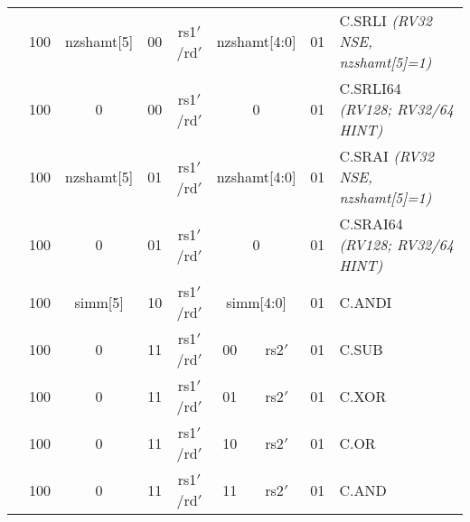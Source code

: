 \begin{table}[h]
\begin{small}
\begin{center}
\begin{tabular}{p{0in}p{0.05in}p{0.05in}p{0.05in}p{0.05in}p{0.05in}p{0.05in}p{0.05in}p{0.05in}p{0.05in}p{0.05in}p{0.05in}p{0.05in}p{0.05in}p{0.05in}p{0.05in}p{0.05in}l}
&
\multicolumn{3}{|c|}{100} &
\multicolumn{1}{c|}{nzshamt[5]} &
\multicolumn{2}{c|}{00} &
\multicolumn{3}{c|}{rs1$'$/rd$'$} &
\multicolumn{5}{c|}{nzshamt[4:0]} &
\multicolumn{2}{c|}{01} & C.SRLI {\em \tiny (RV32 NSE, nzshamt[5]=1)} \\
\cline{2-17}

&
\multicolumn{3}{|c|}{100} &
\multicolumn{1}{c|}{0} &
\multicolumn{2}{c|}{00} &
\multicolumn{3}{c|}{rs1$'$/rd$'$} &
\multicolumn{5}{c|}{0} &
\multicolumn{2}{c|}{01} & C.SRLI64 {\em \tiny (RV128; RV32/64 HINT)} \\
\cline{2-17}

&
\multicolumn{3}{|c|}{100} &
\multicolumn{1}{c|}{nzshamt[5]} &
\multicolumn{2}{c|}{01} &
\multicolumn{3}{c|}{rs1$'$/rd$'$} &
\multicolumn{5}{c|}{nzshamt[4:0]} &
\multicolumn{2}{c|}{01} & C.SRAI {\em \tiny (RV32 NSE, nzshamt[5]=1)} \\
\cline{2-17}

&
\multicolumn{3}{|c|}{100} &
\multicolumn{1}{c|}{0} &
\multicolumn{2}{c|}{01} &
\multicolumn{3}{c|}{rs1$'$/rd$'$} &
\multicolumn{5}{c|}{0} &
\multicolumn{2}{c|}{01} & C.SRAI64 {\em \tiny (RV128; RV32/64 HINT)} \\
\cline{2-17}

&
\multicolumn{3}{|c|}{100} &
\multicolumn{1}{c|}{simm[5]} &
\multicolumn{2}{c|}{10} &
\multicolumn{3}{c|}{rs1$'$/rd$'$} &
\multicolumn{5}{c|}{simm[4:0]} &
\multicolumn{2}{c|}{01} & C.ANDI \\
\cline{2-17}

&
\multicolumn{3}{|c|}{100} &
\multicolumn{1}{c|}{0} &
\multicolumn{2}{c|}{11} &
\multicolumn{3}{c|}{rs1$'$/rd$'$} &
\multicolumn{2}{c|}{00} &
\multicolumn{3}{c|}{rs2$'$} &
\multicolumn{2}{c|}{01} & C.SUB \\
\cline{2-17}

&
\multicolumn{3}{|c|}{100} &
\multicolumn{1}{c|}{0} &
\multicolumn{2}{c|}{11} &
\multicolumn{3}{c|}{rs1$'$/rd$'$} &
\multicolumn{2}{c|}{01} &
\multicolumn{3}{c|}{rs2$'$} &
\multicolumn{2}{c|}{01} & C.XOR \\
\cline{2-17}

&
\multicolumn{3}{|c|}{100} &
\multicolumn{1}{c|}{0} &
\multicolumn{2}{c|}{11} &
\multicolumn{3}{c|}{rs1$'$/rd$'$} &
\multicolumn{2}{c|}{10} &
\multicolumn{3}{c|}{rs2$'$} &
\multicolumn{2}{c|}{01} & C.OR \\
\cline{2-17}

&
\multicolumn{3}{|c|}{100} &
\multicolumn{1}{c|}{0} &
\multicolumn{2}{c|}{11} &
\multicolumn{3}{c|}{rs1$'$/rd$'$} &
\multicolumn{2}{c|}{11} &
\multicolumn{3}{c|}{rs2$'$} &
\multicolumn{2}{c|}{01} & C.AND \\
\cline{2-17}


\end{tabular}
\end{center}
\end{small}
\end{table}
